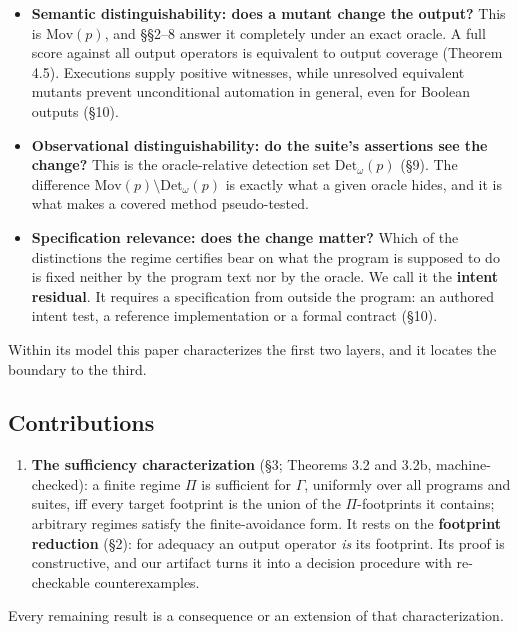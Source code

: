 \documentclass[conference]{IEEEtran}
\newcommand{\Mov}{\mathrm{Mov}}
\newcommand{\Det}{\mathrm{Det}}
\theoremstyle{run}
\begin{document}
\begin{itemize}
\item \textbf{Semantic distinguishability: does a mutant change the output?} This is $\Mov(p)$, and \S \S 2--8 answer it completely under an exact oracle. A full score against all output operators is equivalent to output coverage (Theorem 4.5). Executions supply positive witnesses, while unresolved equivalent mutants prevent unconditional automation in general, even for Boolean outputs (\S 10).
\item \textbf{Observational distinguishability: do the suite's assertions see the change?} This is the oracle-relative detection set $\Det_\omega(p)$ (\S 9). The difference $\Mov(p) \setminus \Det_\omega(p)$ is exactly what a given oracle hides, and it is what makes a covered method pseudo-tested.
\item \textbf{Specification relevance: does the change matter?} Which of the distinctions the regime certifies bear on what the program is supposed to do is fixed neither by the program text nor by the oracle. We call it the \textbf{intent residual}. It requires a specification from outside the program: an authored intent test, a reference implementation or a formal contract (\S 10).
\end{itemize}

Within its model this paper characterizes the first two layers, and it locates the boundary to the third.

\setcounter{subsection}{2}
\subsection{Contributions}
\begin{enumerate}
\item \textbf{The sufficiency characterization} (\S 3; Theorems 3.2 and 3.2b, machine-checked): a finite regime $\Pi$ is sufficient for $\Gamma$, uniformly over all programs and suites, iff every target footprint is the union of the $\Pi$-footprints it contains; arbitrary regimes satisfy the finite-avoidance form. It rests on the \textbf{footprint reduction} (\S 2): for adequacy an output operator \emph{is} its footprint. Its proof is constructive, and our artifact turns it into a decision procedure with re-checkable counterexamples.
\end{enumerate}

Every remaining result is a consequence or an extension of that characterization.
\end{document}
